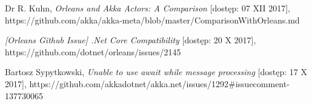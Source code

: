 \begin{thebibliography}{10}%

Dr R. Kuhn, \emph{Orleans and Akka Actors: A Comparison} [dostęp: 07 XII 2017],
https://github.com/akka/akka-meta/blob/master/ComparisonWithOrleans.md

 \emph{[Orleans Github Issue] .Net Core Compatibility} [dostęp: 20 X 2017],
https://github.com/dotnet/orleans/issues/2145

 Bartosz Sypytkowski, \emph{Unable to use await while message processing} [dostęp: 17 X 2017], 
 https://github.com/akkadotnet/akka.net/issues/1292\#issuecomment-137730065



\end{thebibliography}